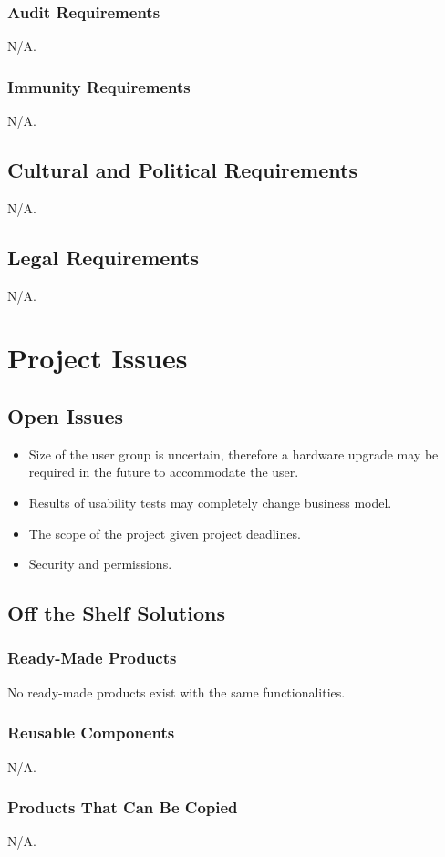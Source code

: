 \documentclass[12pt]{article}
\begin{document}
{\subsubsection{Audit Requirements}
N/A.
\subsubsection{Immunity Requirements}
N/A.
\subsection{Cultural and Political Requirements}
N/A.
\subsection{Legal Requirements}
N/A.

\section{Project Issues}
\subsection{Open Issues}
\begin{itemize}
  \item Size of the user group is uncertain, therefore a hardware upgrade may be 
required in the future to accommodate the user.
  \item Results of usability tests may completely change business model.
  \item The scope of the project given project deadlines.
  \item Security and permissions.
\end{itemize}

\subsection{Off the Shelf Solutions}
\subsubsection{Ready-Made Products}
No ready-made products exist with the same functionalities. 
\subsubsection{Reusable Components}
N/A.
\subsubsection{Products That Can Be Copied}
N/A.
}
\end{document}
